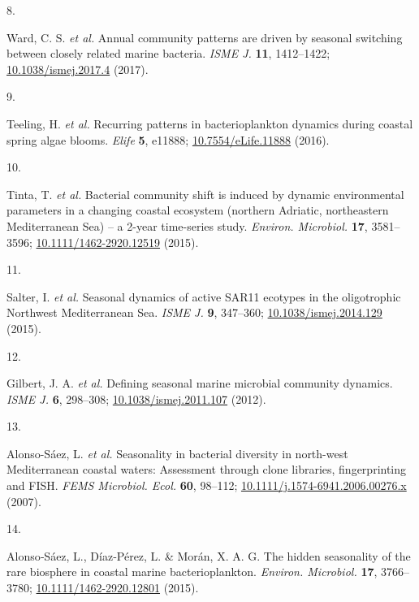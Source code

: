 \documentclass[
  12pt,
]{article}
\newlength{\cslhangindent}
\newlength{\csllabelwidth}
\newlength{\cslentryspacingunit} %
\newenvironment{CSLReferences}[2] %
 {%
  \setlength{\parindent}{0pt}
  \ifodd #1
  \let\oldpar\par
  \def\par{\hangindent=\cslhangindent\oldpar}
  \fi
  \setlength{\parskip}{#2\cslentryspacingunit}
 }%
 {}
\newcommand{\CSLLeftMargin}[1]{\parbox[t]{\csllabelwidth}{#1}}
\newcommand{\CSLRightInline}[1]{\parbox[t]{\linewidth - \csllabelwidth}{#1}\break}
\begin{document}
\begin{CSLReferences}{0}{0}
\leavevmode{}%
\CSLLeftMargin{8. }
\CSLRightInline{Ward, C. S. \emph{et al.} Annual community patterns are
driven by seasonal switching between closely related marine bacteria.
\emph{ISME J.} \textbf{11}, 1412--1422;
\href{https://doi.org/10.1038/ismej.2017.4}{10.1038/ismej.2017.4}
(2017).}

\leavevmode{}%
\CSLLeftMargin{9. }
\CSLRightInline{Teeling, H. \emph{et al.} Recurring patterns in
bacterioplankton dynamics during coastal spring algae blooms.
\emph{Elife} \textbf{5}, e11888;
\href{https://doi.org/10.7554/eLife.11888}{10.7554/eLife.11888} (2016).}

\leavevmode{}%
\CSLLeftMargin{10. }
\CSLRightInline{Tinta, T. \emph{et al.} Bacterial community shift is
induced by dynamic environmental parameters in a changing coastal
ecosystem (northern {Adriatic}, northeastern {Mediterranean Sea}) -- a
2-year time-series study. \emph{Environ. Microbiol.} \textbf{17},
3581--3596;
\href{https://doi.org/10.1111/1462-2920.12519}{10.1111/1462-2920.12519}
(2015).}

\leavevmode{}%
\CSLLeftMargin{11. }
\CSLRightInline{Salter, I. \emph{et al.} Seasonal dynamics of active
{SAR11} ecotypes in the oligotrophic {Northwest Mediterranean Sea}.
\emph{ISME J.} \textbf{9}, 347--360;
\href{https://doi.org/10.1038/ismej.2014.129}{10.1038/ismej.2014.129}
(2015).}

\leavevmode{}%
\CSLLeftMargin{12. }
\CSLRightInline{Gilbert, J. A. \emph{et al.} Defining seasonal marine
microbial community dynamics. \emph{ISME J.} \textbf{6}, 298--308;
\href{https://doi.org/10.1038/ismej.2011.107}{10.1038/ismej.2011.107}
(2012).}

\leavevmode{}%
\CSLLeftMargin{13. }
\CSLRightInline{Alonso-Sáez, L. \emph{et al.} Seasonality in bacterial
diversity in north-west {Mediterranean} coastal waters: Assessment
through clone libraries, fingerprinting and {FISH}. \emph{FEMS
Microbiol. Ecol.} \textbf{60}, 98--112;
\href{https://doi.org/10.1111/j.1574-6941.2006.00276.x}{10.1111/j.1574-6941.2006.00276.x}
(2007).}

\leavevmode{}%
\CSLLeftMargin{14. }
\CSLRightInline{Alonso‐Sáez, L., Díaz‐Pérez, L. \& Morán, X. A. G. The
hidden seasonality of the rare biosphere in coastal marine
bacterioplankton. \emph{Environ. Microbiol.} \textbf{17}, 3766--3780;
\href{https://doi.org/10.1111/1462-2920.12801}{10.1111/1462-2920.12801}
(2015).}


\end{CSLReferences}
\end{document}
